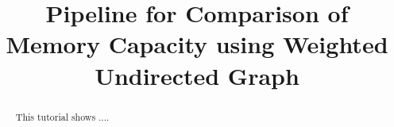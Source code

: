 \documentclass[justified]{tufte-handout}
\title[Comparison of Memory Capacity WU]{Pipeline for Comparison of Memory Capacity using Weighted Undirected Graph}
\begin{document}
\maketitle

\begin{abstract}
\noindent
This tutorial shows ....
\end{abstract}
\end{document}
